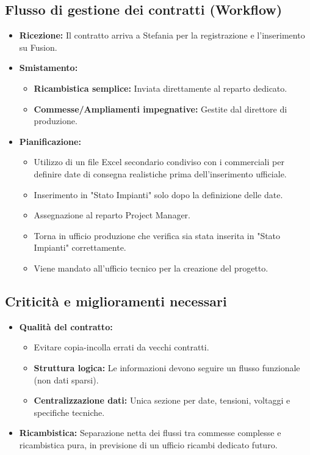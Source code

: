 \documentclass[12pt, a4paper]{article} %
\begin{document}
\subsection{Flusso di gestione dei contratti (Workflow)}
\begin{itemize}
    \item \textbf{Ricezione:} Il contratto arriva a Stefania per la registrazione e l'inserimento su Fusion.
    \item \textbf{Smistamento:}
    \begin{itemize}
        \item \textbf{Ricambistica semplice:} Inviata direttamente al reparto dedicato.
        \item \textbf{Commesse/Ampliamenti impegnative:} Gestite dal direttore di produzione.
    \end{itemize}
    \item \textbf{Pianificazione:}
    \begin{itemize}
        \item Utilizzo di un file Excel secondario condiviso con i commerciali per definire date di consegna realistiche prima dell'inserimento ufficiale.
        \item Inserimento in "Stato Impianti" solo dopo la definizione delle date.
        \item Assegnazione al reparto Project Manager.
        \item Torna in ufficio produzione che verifica sia stata inserita in "Stato Impianti" correttamente.
        \item Viene mandato all'ufficio tecnico per la creazione del progetto.
    \end{itemize}
\end{itemize}

\subsection{Criticità e miglioramenti necessari}
\begin{itemize}
    \item \textbf{Qualità del contratto:} 
    \begin{itemize}
        \item Evitare copia-incolla errati da vecchi contratti.
        \item \textbf{Struttura logica:} Le informazioni devono seguire un flusso funzionale (non dati sparsi).
        \item \textbf{Centralizzazione dati:} Unica sezione per date, tensioni, voltaggi e specifiche tecniche.
    \end{itemize}
    \item \textbf{Ricambistica:} Separazione netta dei flussi tra commesse complesse e ricambistica pura, in previsione di un ufficio ricambi dedicato futuro.
\end{itemize}
\end{document}
